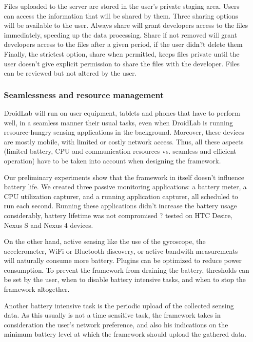\documentclass[conference,letterpaper]{IEEEtran}
\begin{document}
Files uploaded to the server are stored in the user's private staging area. Users can access the information that will be shared by them. Three sharing options will be available to the user. Always share will grant developers access to the files immediately, speeding up the data processing. Share if not removed will grant developers access to the files after a given period, if the user didn?t delete them Finally, the strictest option, share when permitted, keeps files private until the user doesn't give explicit permission to share the files with the developer. Files can be reviewed but not altered by the user.

\subsubsection{Seamlessness and resource management}

DroidLab will run on user equipment, tablets and phones that have to perform well, in a seamless manner their usual tasks, even when DroidLab is running resource-hungry sensing applications in the background. Moreover, these devices are mostly mobile, with limited or costly network access. Thus, all these aspects (limited battery, CPU and communication resources vs. seamless and efficient operation) have to be taken into account when designing the framework. 

Our preliminary experiments show that the framework in itself doesn't influence battery life. We created three passive monitoring applications: a battery meter, a CPU utilization capturer, and a running application capturer, all scheduled to run each second. Running these applications didn't increase the battery usage considerably, battery lifetime was not compromised ? tested on HTC Desire, Nexus S and Nexus 4 devices.

On the other hand, active sensing like the use of the gyroscope, the accelerometer, WiFi or Bluetooth discovery, or active bandwith measurements will naturally consume more battery. Plugins can be optimized to reduce power consumption. To prevent the framework from draining the battery, thresholds can be set by the user, when to disable battery intensive tasks, and when to stop the framework altogether.

Another battery intensive task is the periodic upload of the collected sensing data. As this usually is not a time sensitive task, the framework takes in consideration the user's network preference, and also his indications on the minimum battery level at which the framework should upload the gathered data.
\end{document}
